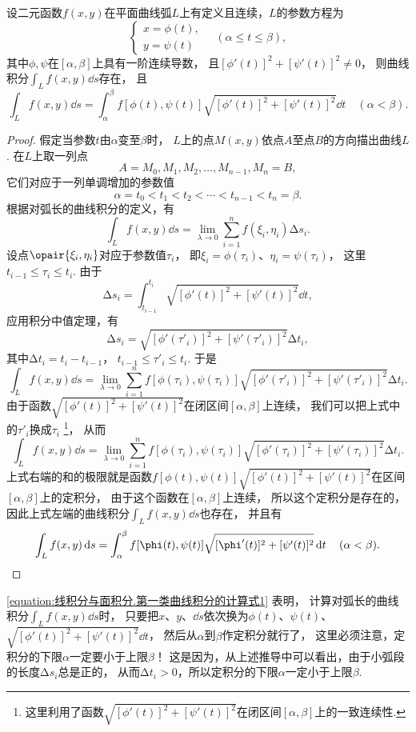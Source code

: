 \begin{theorem}
设二元函数\(f(x,y)\)在平面曲线弧\(L\)上有定义且连续，\(L\)的参数方程为\[
	\left\{ \begin{array}{l}
		x = \phi(t), \\
		y = \psi(t)
	\end{array} \right.
	\quad(\alpha \leq t \leq \beta),
\]
其中\(\phi,\psi\)在\([\alpha,\beta]\)上具有一阶连续导数，
且\([\phi'(t)]^2+[\psi'(t)]^2 \neq 0\)，
则曲线积分\(\int_L f(x,y) \dd{s}\)存在，
且\begin{equation}\label{equation:线积分与面积分.第一类曲线积分的计算式1}
	\int_L f(x,y) \dd{s}
	= \int_\alpha^\beta f[\phi(t),\psi(t)] \sqrt{[\phi'(t)]^2+[\psi'(t)]^2} \dd{t}
	\quad(\alpha<\beta).
\end{equation}
\begin{proof}
假定当参数\(t\)由\(\alpha\)变至\(\beta\)时，
\(L\)上的点\(M(x,y)\)依点\(A\)至点\(B\)的方向描出曲线\(L\).
在\(L\)上取一列点\[
	A=M_0,M_1,M_2,\dotsc,M_{n-1},M_n=B,
\]
它们对应于一列单调增加的参数值\[
	\alpha=t_0<t_1<t_2<\dotsb<t_{n-1}<t_n=\beta.
\]
根据对弧长的曲线积分的定义，有\[
	\int_L f(x,y) \dd{s} = \lim_{\lambda\to0} \sum_{i=1}^n f(\xi_i,\eta_i) \increment s_i.
\]
设点\(\opair{\xi_i,\eta_i}\)对应于参数值\(\tau_i\)，
即\(\xi_i=\phi(\tau_i)\)、\(\eta_i=\psi(\tau_i)\)，
这里\(t_{i-1}\leq\tau_i\leq t_i\).
由于\[
	\increment s_i = \int_{t_{i-1}}^{t_i} \sqrt{[\phi'(t)]^2+[\psi'(t)]^2} \dd{t},
\]
应用积分中值定理，有\[
	\increment s_i = \sqrt{[\phi'(\tau'_i)]^2+[\psi'(\tau'_i)]^2} \increment t_i,
\]
其中\(\increment t_i = t_i - t_{i-1}\)，
\(t_{i-1} \leq \tau'_i \leq t_i\).
于是\[
	\int_L f(x,y) \dd{s}
	= \lim_{\lambda\to0} \sum_{i=1}^n f[\phi(\tau_i),\psi(\tau_i)] \sqrt{[\phi'(\tau'_i)]^2+[\psi'(\tau'_i)]^2} \increment t_i.
\]
由于函数\(\sqrt{[\phi'(t)]^2+[\psi'(t)]^2}\)在闭区间\([\alpha,\beta]\)上连续，
我们可以把上式中的\(\tau'_i\)换成\(\tau_i\)
\footnote{这里利用了函数\(\sqrt{[\phi'(t)]^2+[\psi'(t)]^2}\)在闭区间\([\alpha,\beta]\)上的一致连续性.}，
从而\[
	\int_L f(x,y) \dd{s}
	= \lim_{\lambda\to0} \sum_{i=1}^n f[\phi(\tau_i),\psi(\tau_i)] \sqrt{[\phi'(\tau_i)]^2+[\psi'(\tau_i)]^2} \increment t_i.
\]
上式右端的和的极限就是函数\(f[\phi(t),\psi(t)] \sqrt{[\phi'(t)]^2+[\psi'(t)]^2}\)在区间\([\alpha,\beta]\)上的定积分，
由于这个函数在\([\alpha,\beta]\)上连续，
所以这个定积分是存在的，
因此上式左端的曲线积分\(\int_L f(x,y) \dd{s}\)也存在，
并且有\[
	\int_L f(x,y) \dd{s}
	= \int_\alpha^\beta f[\phi(t),\psi(t)] \sqrt{[\phi'(t)]^2+[\psi'(t)]^2} \dd{t}
	\quad(\alpha<\beta).
	\qedhere
\]
\end{proof}
\end{theorem}
\cref{equation:线积分与面积分.第一类曲线积分的计算式1} 表明，
计算对弧长的曲线积分\(\int_L f(x,y) \dd{s}\)时，
只要把\(x\)、\(y\)、\(\dd{s}\)依次换为\(\phi(t)\)、\(\psi(t)\)、\(\sqrt{[\phi'(t)]^2+[\psi'(t)]^2} \dd{t}\)，
然后从\(\alpha\)到\(\beta\)作定积分就行了，
这里必须注意，定积分的下限\(\alpha\)一定要小于上限\(\beta\)！
这是因为，从上述推导中可以看出，由于小弧段的长度\(\increment s_i\)总是正的，
从而\(\increment t_i > 0\)，所以定积分的下限\(\alpha\)一定小于上限\(\beta\).

